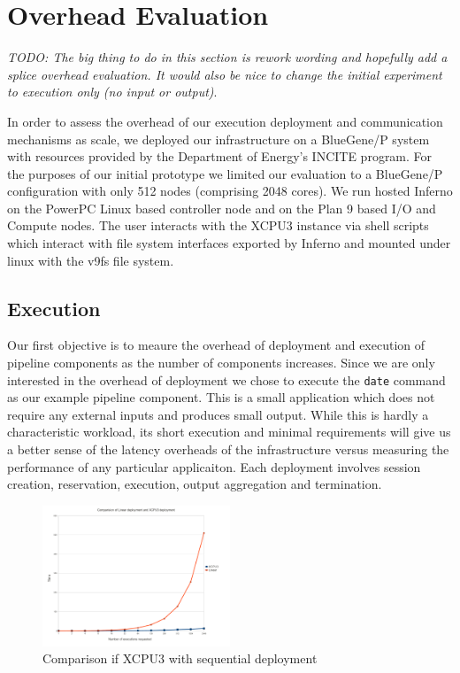 \section{Overhead Evaluation}
\emph{TODO: The big thing to do in this section is rework wording and
hopefully add a splice overhead evaluation. It would also be nice to
change the initial experiment to execution only (no input or output)}.

In order to assess the overhead of our execution deployment and communication
mechanisms as scale, we deployed our infrastructure on a BlueGene/P system
with resources provided by the Department of Energy's INCITE program.
For the purposes of our initial prototype we limited our evaluation to a
BlueGene/P configuration with only 512 nodes (comprising 2048 cores).
We run hosted Inferno on the PowerPC Linux based controller node and on
the Plan 9 based I/O and Compute nodes.
The user interacts with the XCPU3 instance via shell scripts which 
interact with file system interfaces exported by Inferno and mounted 
under linux with the v9fs file system.

\subsection{Execution}

Our first objective is to meaure the overhead of deployment and execution
of pipeline components as the number of components increases.  Since we 
are only interested in the overhead of deployment we chose to execute the
\texttt{date} command as our example pipeline component.
This is a small application which does not require any external inputs 
and produces small output. 
While this is hardly a characteristic workload, its short execution and
minimal requirements will give us a better sense of the latency overheads
of the infrastructure versus measuring the performance of any particular
applicaiton.
Each deployment involves
session creation, reservation, execution, output aggregation and termination.

\begin{figure}[h]
  \begin{center}
    \leavevmode
      \includegraphics[height=0.2\textheight,width=0.5\textwidth]
		{./img/linear}
    \caption{Comparison if XCPU3 with sequential deployment}
    \label{fig:sequential}
  \end{center}
\end{figure}

